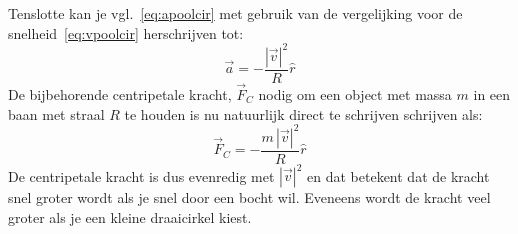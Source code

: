 Tenslotte kan je vgl.~\ref{eq:apoolcir} met gebruik van de vergelijking voor de snelheid~\ref{eq:vpoolcir}
herschrijven tot:
\begin{equation}
\vec{a} = -\frac{|\vec{v}|^2}{R}\hat{r}
\end{equation}
De bijbehorende centripetale kracht, $\vec{F}_C$ nodig om een object met massa $m$ in een baan met straal $R$
te houden is nu natuurlijk direct te schrijven schrijven als:
\begin{equation}\label{eq:fc_cirkel}
\vec{F}_C = -\frac{m\,|\vec{v}|^2}{R}\hat{r}
\end{equation}
De centripetale kracht is dus evenredig met $|\vec{v}|^2$ en dat betekent dat de kracht snel 
groter wordt als je snel door een bocht wil. Eveneens wordt de kracht veel groter als je een
kleine draaicirkel kiest.

